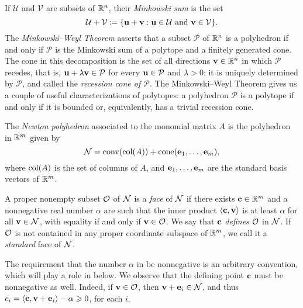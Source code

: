 \documentclass{amsart}
\begin{document}
If $\mathcal{U}$ and $\mathcal{V}$ are subsets of $\mathbb{R}^n$, their \emph{Minkowski sum} is the set
\[\mathcal{U}+\mathcal{V} \coloneqq \{\mathbf{u}+\mathbf{v}: \mathbf{u}\in \mathcal{U}\text{ and }\mathbf{v}\in \mathcal{V}\}.\]
The \emph{Minkowski--Weyl Theorem} asserts that a subset $\mathcal{P}$ of $\mathbb{R}^n$ is a polyhedron if and only if $\mathcal{P}$ is the Minkowski sum of a polytope and a finitely generated cone.
The cone in this decomposition is the set of all directions $\mathbf{v} \in \mathbb{R}^n$ in which $\mathcal{P}$ recedes, that is, $\mathbf{u} + \lambda \mathbf{v} \in \mathcal{P}$ for every $\mathbf{u} \in \mathcal{P}$ and $\lambda > 0$; it is uniquely determined by $\mathcal{P}$, and called the \emph{recession cone of $\mathcal{P}$}.
The Minkowski--Weyl Theorem gives us a couple of useful characterizations of polytopes: a polyhedron $\mathcal{P}$ is a polytope if and only if it is bounded or, equivalently, has a trivial recession cone.

\begin{definition}
The \emph{Newton polyhedron} associated to the monomial matrix $A$ is the polyhedron in $\mathbb{R}^m$ given by
\[ \mathcal{N} = \operatorname{conv}( \operatorname{col}(A) ) + \operatorname{cone}( \mathbf{e}_1, \ldots, \mathbf{e}_m), \]
where $\operatorname{col}(A)$ is the set of columns of $A$, and $\mathbf{e}_1, \ldots, \mathbf{e}_m$ are the standard basis vectors of $\mathbb{R}^m$.
\end{definition}

\begin{definition}[Faces]
   \label{defn: face}
   A proper nonempty subset $\mathcal{O}$ of $\mathcal{N}$ is a \emph{face} of $\mathcal{N}$ if there exists $\mathbf{c} \in \mathbb{R}^m$ and a nonnegative real number $\alpha$ are such that the inner product $\langle \mathbf{c}, \mathbf{v} \rangle$ is at least $\alpha$ for all $\mathbf{v} \in \mathcal{N}$, with equality if and only if $\mathbf{v} \in \mathcal{O}$.
   We say that $\mathbf{c}$ \emph{defines} $\mathcal{O}$ in $\mathcal{N}$.
   If $\mathcal{O}$ is not contained in any proper coordinate subspace of $\mathbb{R}^m$, we call it a \emph{standard} face of $\mathcal{N}$.
\end{definition}

\begin{remark}
   \label{rmk: nonnegativity of defining point}
   The requirement that the number $\alpha$ in  be nonnegative is an arbitrary convention, which will play a role in  below.
   We observe that the defining point $\mathbf{c}$ must be nonnegative as well.
   Indeed, if $\mathbf{v} \in \mathcal{O}$, then $\mathbf{v} + \mathbf{e}_i \in \mathcal{N}$, and thus $c_i = \langle \mathbf{c}, \mathbf{v} + \mathbf{e}_i \rangle -\alpha \geqslant 0$, for each $i$.
\end{remark}
\end{document}
